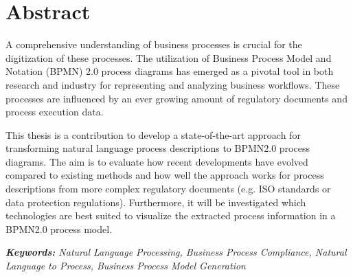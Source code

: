 \chapter*{Abstract}
\noindent
A comprehensive understanding of business processes is crucial for the digitization of these processes. The utilization of Business Process Model and Notation (BPMN) 2.0 process diagrams has emerged as a pivotal tool in both research and industry for representing and analyzing business workflows. These processes are influenced by an ever growing amount of regulatory documents and process execution data.

This thesis is a contribution to develop a state-of-the-art approach for transforming natural language process descriptions to BPMN2.0 process diagrams. The aim is to evaluate how recent developments have evolved compared to existing methods and how well the approach works for process descriptions from more complex regulatory documents (e.g. ISO standards or data protection regulations). Furthermore, it will be investigated which technologies are best suited to visualize the extracted process information in a BPMN2.0 process model.



\textit{\textbf{Keywords: }Natural Language Processing, Business Process Compliance, Natural Language to Process, Business Process Model Generation}

